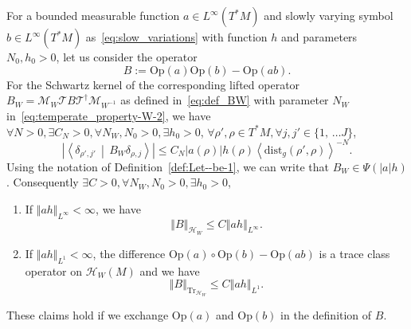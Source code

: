 \documentclass[AHL,Unicode,longabstracts,published]{cedram}
\newcommand{\clT}{\mathcal{T}}
\newcommand{\clH}{\mathcal{H}}
\newcommand{\clM}{\mathcal{M}}
\newcommand{\dist}{\mathrm{dist}}
\newcommand{\Opp}{\mathrm{Op}}
\newcommand{\Tr}{\mathrm{Tr}}
\let\oldexists\exists
\renewcommand*{\exists}{\mathrel{\oldexists}}
\let\oldforall\forall
\renewcommand*{\forall}{\mathrel{\oldforall}}
\newcommand{\clH}{\mathcal{H}}
\begin{document}
\begin{tcolorbox}[enhanced, frame style={purple!80}, interior style={red!0},breakable]
\begin{theo}\label{thm:Composition-of-PDO.}

For a bounded measurable function $a\in L^{\infty}(T^{*}M)$ and slowly varying symbol $b\in L^{\infty}(T^{*}M)$ as~\eqref{eq:slow_variations} with function $h$ and parameters $N_{0},h_{0}>0$, let us consider the operator
\[
B:=\Opp \left(a\right)\Opp \left(b\right)-\Opp \left(ab\right).
\]
For the Schwartz kernel of the corresponding lifted operator $B_{W}=\clM_{W}\clT B\clT^{\dagger}\clM_{W^{-1}}$ as defined in~\eqref{eq:def_BW} with parameter $N_{W}$ in~\eqref{eq:temperate_property-W-2}, we have $\forall N>0,\exists C_{N}>0,\forall N_{W},N_{0}>0,\exists h_{0}>0$, $\forall\rho',\rho\in T^{*}M,\forall j,j'\in\{ 1,\,\ldots J\} $,
\[
\left|\left\langle\delta_{\rho',j'}\,\middle|\,B_{W}\delta_{\rho,j}\right\rangle\right|\leq C_{N}\left|a\left(\rho\right)\right|h\left(\rho\right)\left\langle \dist_{g}\left(\rho',\rho\right)\right\rangle^{-N}.
\]
Using the notation of Definition~\ref{def:Let--be-1}, we can write that $B_{W}\in\Psi(|a|h)$. Consequently $\exists C>0,\forall N_{W},N_{0}>0,\exists h_{0}>0$,
\begin{enumerate}
\item If $\Vert ah\Vert _{L^{\infty}}<\infty$, we have
\begin{equation}\label{eq:norm_Compos_PDO}
\left\Vert B\right\Vert _{\clH _{W}}\leq C\left\Vert ah\right\Vert _{L^{\infty}}.
\end{equation}
\item If $\Vert ah\Vert _{L^{1}}<\infty$, the difference $\Opp (a)\circ\Opp (b)-\Opp (ab)$ is a trace class operator on $\clH _{W}(M)$ and we have
\[
\left\Vert B\right\Vert _{\Tr_{\clH _{W}}}\leq C\left\Vert ah\right\Vert _{L^{1}}.
\]
\end{enumerate}
These claims hold if we exchange $\Opp (a)$ and $\Opp (b)$ in the definition of $B$.
\end{theo}
\end{tcolorbox}
\end{document}
